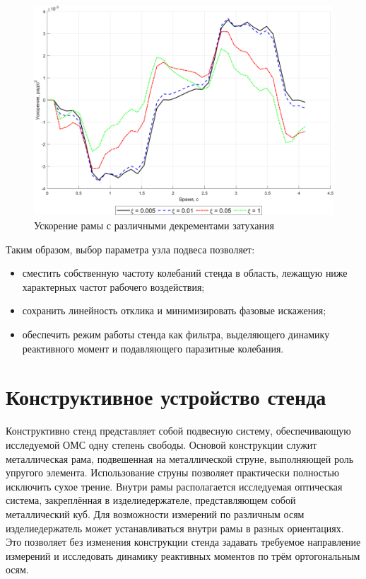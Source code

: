 \begin{figure}[!h]
	\centering
	\includegraphics[scale=0.7]{matlab/decrement.png}
	\caption{Ускорение рамы с различными декрементами затухания}
	\label{fig:decrement}
\end{figure}

Таким образом, выбор параметра узла подвеса позволяет:

\begin{itemize}
	\item сместить собственную частоту колебаний стенда в область, лежащую ниже характерных частот рабочего воздействия;
	\item сохранить линейность отклика и минимизировать фазовые искажения;
	\item обеспечить режим работы стенда как фильтра, выделяющего динамику реактивного момент и подавляющего паразитные колебания.
\end{itemize}

\section{Конструктивное устройство стенда}

Конструктивно стенд представляет собой подвесную систему, обеспечивающую исследуемой ОМС одну степень свободы. Основой конструкции служит металлическая рама, подвешенная на металлической струне, выполняющей роль упругого элемента. Использование струны позволяет практически полностью исключить сухое трение. Внутри рамы располагается исследуемая оптическая система, закреплённая в изделиедержателе, представляющем собой металлический куб. Для возможности измерений по различным осям изделиедержатель может устанавливаться внутри рамы в разных ориентациях. Это позволяет без изменения конструкции стенда задавать требуемое направление измерений и исследовать динамику реактивных моментов по трём ортогональным осям.

